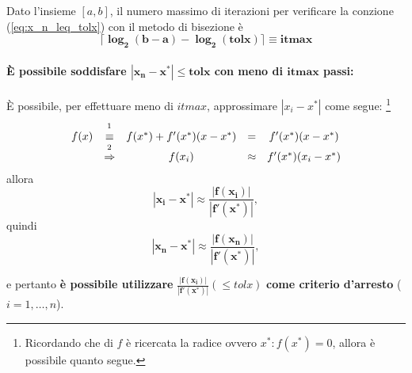 \addtocounter{footnote}{-1}


\begin{definition}\label{def:itmax_metodo_bisezione}
	Dato l'insieme $[a,b]$, il numero massimo di iterazioni per verificare la conzione (\ref{eq:x_n_leq_tolx}) con il metodo di bisezione è
	\begin{equation*}
		\boldsymbol{\lceil \log_{2}(b-a)-\log_{2}(tolx)\rceil \equiv itmax}
	\end{equation*}
\end{definition}

\paragraph{È possibile soddisfare $\boldsymbol{|x_n-x^*|\leq tolx}$ con meno di $\boldsymbol{itmax}$ passi:}
È possibile, per effettuare meno di $itmax$, approssimare $|x_i-x^*|$ come segue:
\footnote{Ricordando che di $f$ è ricercata la radice ovvero $x^*:f(x^*)=0$, allora è possibile quanto segue.}
\begin{equation*}
	\begin{matrix}
		f(x)&\overset{\footnotemark}{\equiv}& f(x^*)+f'(x^*)(x-x^*)&=&f'(x^*)(x-x^*)\\
		&\overset{\footnotemark}{\Rightarrow}&f(x_i)&\approx& f'(x^*)(x_i-x^*)
	\end{matrix}
\end{equation*}
\footnotemark  allora
\begin{equation*}
	\boldsymbol{|x_i-x^*| \approx \frac{|f(x_i)|}{|f'(x^*)|}},
\end{equation*}
quindi
\begin{equation*}
	\boldsymbol{|x_n-x^*| \approx \frac{|f(x_n)|}{|f'(x^*)|}},
\end{equation*}

\addtocounter{footnote}{-2}



\noindent e pertanto \textbf{è possibile utilizzare} $\boldsymbol{\frac{|f(x_i)|}{|f'(x^*)|}}(\leq tolx)$ \textbf{come criterio d'arresto} ($i=1,\hdots, n$). 

